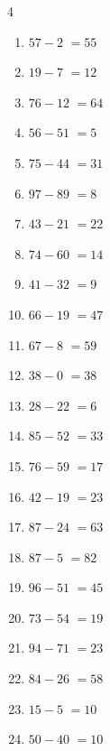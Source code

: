 \begin{multicols}{4}
\begin{enumerate}
  \item $57-2$
        $=55$

  \item $19-7$
        $=12$

  \item $76-12$
        $=64$

  \item $56-51$
        $=5$

  \item $75-44$
        $=31$

  \item $97-89$
        $=8$

  \item $43-21$
        $=22$

  \item $74-60$
        $=14$

  \item $41-32$
        $=9$

  \item $66-19$
        $=47$

  \item $67-8$
        $=59$

  \item $38-0$
        $=38$

  \item $28-22$
        $=6$

  \item $85-52$
        $=33$

  \item $76-59$
        $=17$

  \item $42-19$
        $=23$

  \item $87-24$
        $=63$

  \item $87-5$
        $=82$

  \item $96-51$
        $=45$

  \item $73-54$
        $=19$

  \item $94-71$
        $=23$

  \item $84-26$
        $=58$

  \item $15-5$
        $=10$

  \item $50-40$
        $=10$


\end{enumerate}
\end{multicols}
